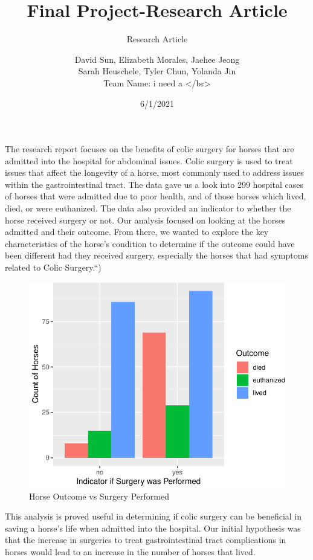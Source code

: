 \documentclass[12pt,]{article}
\title{Final Project-Research Article}
\subtitle{Research Article}
\author{David Sun, Elizabeth Morales, Jaehee Jeong\\
Sarah Heuschele, Tyler Chun, Yolanda Jin\\[2\baselineskip]Team Name: i
need a \textless{}/br\textgreater{}}
\date{6/1/2021}
\begin{document}
\maketitle

{
\setcounter{tocdepth}{2}
\tableofcontents
}
The research report focuses on the benefits of colic surgery for horses
that are admitted into the hospital for abdominal issues. Colic surgery
is used to treat issues that affect the longevity of a horse, most
commonly used to address issues within the gastrointestinal tract. The
data gave us a look into 299 hospital cases of horses that were admitted
due to poor health, and of those horses which lived, died, or were
euthanized. The data also provided an indicator to whether the horse
received surgery or not. Our analysis focused on looking at the horses
admitted and their outcome. From there, we wanted to explore the key
characteristics of the horse's condition to determine if the outcome
could have been different had they received surgery, especially the
horses that had symptoms related to Colic Surgery.``)

\begin{figure}

\hfill{}\includegraphics[width=.7\textwidth]{Final_Project_-_Executive_Summary_files/figure-latex/unnamed-chunk-4-1} 

\caption{Horse Outcome vs Surgery Performed}\label{fig:unnamed-chunk-4}
\end{figure}

This analysis is proved useful in determining if colic surgery can be
beneficial in saving a horse's life when admitted into the hospital. Our
initial hypothesis was that the increase in surgeries to treat
gastrointestinal tract complications in horses would lead to an increase
in the number of horses that lived.
\end{document}
